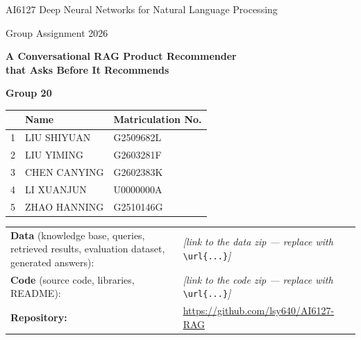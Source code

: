 \documentclass[10pt,a4paper,twocolumn]{article}
\renewcommand{\arraystretch}{1.08}
\begin{document}
\begin{titlepage}
\centering
\vspace*{0.8cm}
{\large AI6127 Deep Neural Networks for Natural Language Processing\par}
\vspace{4pt}
{\large Group Assignment 2026\par}
\vspace{1.6cm}
{\fontsize{24}{30}\selectfont\bfseries A Conversational RAG Product Recommender\\[4pt] that Asks Before It Recommends\par}
\vspace{1.3cm}
{\LARGE\bfseries Group 20\par}
\vspace{1.0cm}

{\large
\renewcommand{\arraystretch}{1.55}
\begin{tabular}{@{}c p{7.2cm} p{4.2cm}@{}}
\toprule
 & \textbf{Name} & \textbf{Matriculation No.}\\
\midrule
1 & {LIU SHIYUAN} & {G2509682L}\\
2 & {LIU YIMING} & {G2603281F}\\
3 & {CHEN CANYING} & {G2602383K}\\
4 & {LI XUANJUN} & {U0000000A}\\
5 & {ZHAO HANNING} & {G2510146G}\\
\bottomrule
\end{tabular}\par}
\vspace{1.2cm}

{\renewcommand{\arraystretch}{1.5}
\begin{tabular}{@{}>{\raggedright\arraybackslash}p{5.6cm} >{\raggedright\arraybackslash}p{9.4cm}@{}}
\textbf{Data} (knowledge base, queries, retrieved results, evaluation dataset, generated answers): & \textit{[link to the data zip — replace with} \texttt{\textbackslash url\{...\}}\textit{]}\\
\textbf{Code} (source code, libraries, README): & \textit{[link to the code zip — replace with} \texttt{\textbackslash url\{...\}}\textit{]}\\
\textbf{Repository:} & \url{https://github.com/lsy640/AI6127-RAG}\\
\end{tabular}\par}
\vspace{1.2cm}


\end{titlepage}
\end{document}
